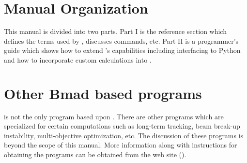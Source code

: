 \section{Manual Organization}

This manual is divided into two parts. Part I is the reference section which defines the terms used
by \tao, discusses \tao commands, etc. Part II is a programmer's guide which shows how to extend
\tao's capabilities including interfacing to Python and how to incorporate custom calculations into
\tao.

\section{Other Bmad based programs}
\label{s:other}

\tao is not the only program based upon \bmad. There are other programs which are specialized for
certain computations such as long-term tracking, beam break-up instability, multi-objective
optimization, etc. The discussion of these programs is beyond the scope of this manual. More
information along with instructions for obtaining the programs can be obtained from the \bmad web site ().

